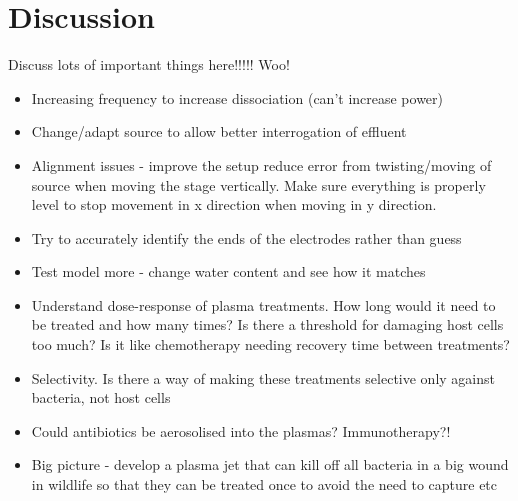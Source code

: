 \documentclass[11pt, oneside]{article}   	%
\begin{document}
\section{Discussion}

Discuss lots of important things here!!!!! Woo!

\begin{itemize}
\item Increasing frequency to increase dissociation (can't increase power)
\item Change/adapt source to allow better interrogation of effluent
\item Alignment issues - improve the setup reduce error from twisting/moving of source when moving the stage vertically. Make sure everything is properly level to stop movement in x direction when moving in y direction.
\item Try to accurately identify the ends of the electrodes rather than guess
\item Test model more - change water content and see how it matches

\item Understand dose-response of plasma treatments. How long would it need to be treated and how many times? Is there a threshold for damaging host cells too much? Is it like chemotherapy needing recovery time between treatments? 
\item Selectivity. Is there a way of making these treatments selective only against bacteria, not host cells
\item Could antibiotics be aerosolised into the plasmas? Immunotherapy?!
\item Big picture - develop a plasma jet that can kill off all bacteria in a big wound in wildlife so that they can be treated once to avoid the need to capture etc

\end{itemize}



\end{document}
